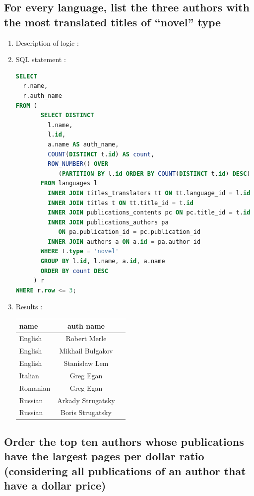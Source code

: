 \documentclass[doubleside, titlepage]{article}
\begin{document}
\subsection{For every language, list the three authors with the most translated titles of “novel” type}

	\begin{enumerate}
	\item Description of logic : %
	\item SQL statement :
		\begin{lstlisting}[language=SQL,showspaces=false,basicstyle=\ttfamily,numberstyle=\tiny,commentstyle=\color{gray}]
SELECT
  r.name,
  r.auth_name
FROM (
       SELECT DISTINCT
         l.name,
         l.id,
         a.name AS auth_name,
         COUNT(DISTINCT t.id) AS count,
         ROW_NUMBER() OVER
         	(PARTITION BY l.id ORDER BY COUNT(DISTINCT t.id) DESC) as row
       FROM languages l
         INNER JOIN titles_translators tt ON tt.language_id = l.id
         INNER JOIN titles t ON tt.title_id = t.id
         INNER JOIN publications_contents pc ON pc.title_id = t.id
         INNER JOIN publications_authors pa
         	ON pa.publication_id = pc.publication_id
         INNER JOIN authors a ON a.id = pa.author_id
       WHERE t.type = 'novel'
       GROUP BY l.id, l.name, a.id, a.name
       ORDER BY count DESC
     ) r
WHERE r.row <= 3;
		\end{lstlisting}

	\item Results :\\

	\begin{tabular}{|l|c|r|}
	  \hline
		name & auth name\\
	  \hline
English	& Robert Merle\\
English	& Mikhail Bulgakov\\
English	& Stanisław Lem\\
Italian	& Greg Egan\\
Romanian & Greg Egan\\
Russian	& Arkady Strugatsky\\
Russian	& Boris Strugatsky\\
	  \hline
	\end{tabular}
\end{enumerate}

\subsection{Order the top ten authors whose publications have the largest pages per dollar ratio (considering all publications of an author that have a dollar price)}
\end{document}
